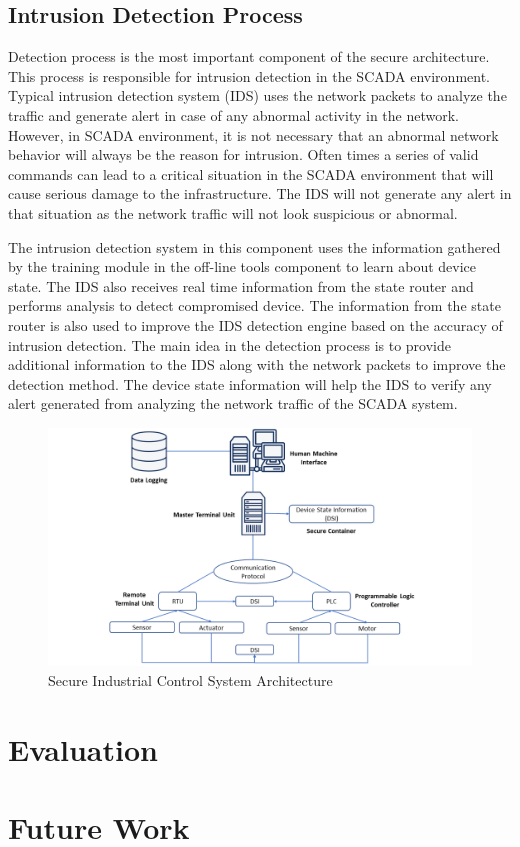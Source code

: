 \documentclass[conference]{IEEEtran}
\begin{document}
\subsection{Intrusion Detection Process}
Detection process is the most important component of the secure architecture. This process is responsible for intrusion detection in the SCADA environment. Typical intrusion detection system (IDS) uses the network packets to analyze the traffic and generate alert in case of any abnormal activity in the network. However, in SCADA environment, it is not necessary that an abnormal network behavior will always be the reason for intrusion. Often times a series of valid commands can lead to a critical situation in the SCADA environment that will cause serious damage to the infrastructure. The IDS will not generate any alert in that situation as the network traffic will not look suspicious or abnormal.
\par The intrusion detection system in this component uses the information gathered by the training module in the off-line tools component to learn about device state. The IDS also receives real time information from the state router and performs analysis to detect compromised device. The information from the state router is also used to improve the IDS detection engine based on the accuracy of intrusion detection. The main idea in the detection process is to provide additional information to the IDS along with the network packets to improve the detection method. The device state information will help the IDS to verify any alert generated from analyzing the network traffic of the SCADA system.  
\begin{figure}[htbp]
\centering
\centerline{\includegraphics [width=.5\textwidth]{sec_arch.png}}
\caption{Secure Industrial Control System Architecture}
\label{fig}
%
\end{figure}

\section{Evaluation}

\section{Future Work}
\end{document}
